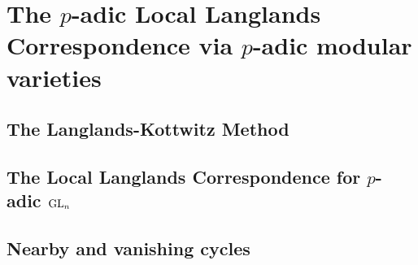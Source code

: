     \part{The \texorpdfstring{$p$}{}-adic Local Langlands Correspondence via \texorpdfstring{$p$}{}-adic modular varieties}
        \chapter{The Langlands-Kottwitz Method}
            \begin{abstract}
                    
            \end{abstract}
            
            \minitoc
            
            
            
            
            
        \chapter{The Local Langlands Correspondence for \texorpdfstring{$p$}{}-adic \texorpdfstring{$\operatorname{GL}_n$}{}}
            \begin{abstract}
                    
            \end{abstract}
            
            \minitoc
        
    \begin{appendices}
        \chapter{Nearby and vanishing cycles}
            \begin{abstract}
                
            \end{abstract}
            
            \minitoc
            
            
            
            
    \end{appendices}
    
